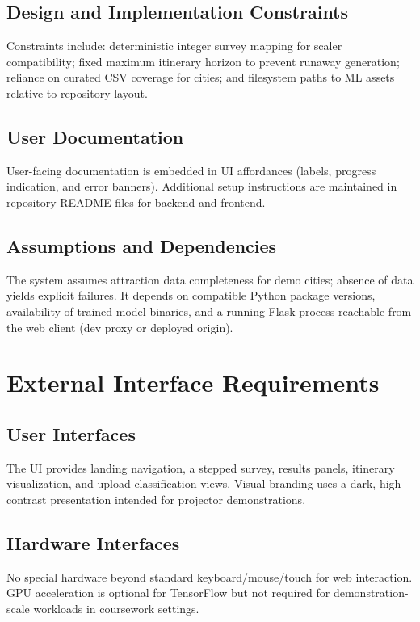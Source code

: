 \documentclass[12pt,oneside,openany]{report}
\begin{document}
\subsection{Design and Implementation Constraints}
Constraints include: deterministic integer survey mapping for scaler compatibility; fixed maximum itinerary horizon to prevent runaway generation; reliance on curated CSV coverage for cities; and filesystem paths to ML assets relative to repository layout.

\subsection{User Documentation}
User-facing documentation is embedded in UI affordances (labels, progress indication, and error banners). Additional setup instructions are maintained in repository README files for backend and frontend.

\subsection{Assumptions and Dependencies}
The system assumes attraction data completeness for demo cities; absence of data yields explicit failures. It depends on compatible Python package versions, availability of trained model binaries, and a running Flask process reachable from the web client (dev proxy or deployed origin).

\section{External Interface Requirements}

\subsection{User Interfaces}
The UI provides landing navigation, a stepped survey, results panels, itinerary visualization, and upload classification views. Visual branding uses a dark, high-contrast presentation intended for projector demonstrations.

\subsection{Hardware Interfaces}
No special hardware beyond standard keyboard/mouse/touch for web interaction. GPU acceleration is optional for TensorFlow but not required for demonstration-scale workloads in coursework settings.
\end{document}
